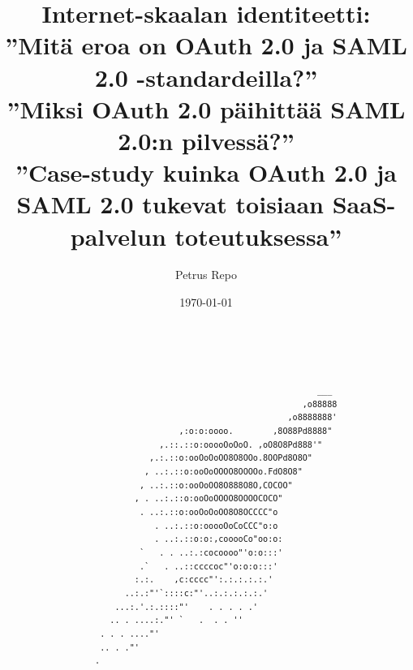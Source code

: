 \documentclass[finnish,gradu]{tktltiki}
\begin{document}
\title{Internet-skaalan identiteetti:
    \\ ''Mitä eroa on OAuth 2.0 ja SAML 2.0 -standardeilla?''
    \\ ''Miksi OAuth 2.0 päihittää SAML 2.0:n pilvessä?''
    \\ ''Case-study kuinka OAuth 2.0 ja SAML 2.0 tukevat toisiaan SaaS-palvelun toteutuksessa''}

\author{Petrus Repo}
\date{\today}
\maketitle


\onehalfspacing

\subject{Tietojenkäsittelytiede}


\begin{abstract}

  \begin{verbatim}




                                                            ___
                                                         ,o88888
                                                      ,o8888888'
                                ,:o:o:oooo.        ,8O88Pd8888"
                            ,.::.::o:ooooOoOoO. ,oO8O8Pd888'"
                          ,.:.::o:ooOoOoOO8O8OOo.8OOPd8O8O"
                         , ..:.::o:ooOoOOOO8OOOOo.FdO8O8"
                        , ..:.::o:ooOoOO8O888O8O,COCOO"
                       , . ..:.::o:ooOoOOOO8OOOOCOCO"
                        . ..:.::o:ooOoOoOO8O8OCCCC"o
                           . ..:.::o:ooooOoCoCCC"o:o
                           . ..:.::o:o:,cooooCo"oo:o:
                        `   . . ..:.:cocoooo"'o:o:::'
                        .`   . ..::ccccoc"'o:o:o:::'
                       :.:.    ,c:cccc"':.:.:.:.:.'
                     ..:.:"'`::::c:"'..:.:.:.:.:.'
                   ...:.'.:.::::"'    . . . . .'
                  .. . ....:."' `   .  . . ''
                . . . ...."'
                .. . ."'
               .

  \end{verbatim}

\end{abstract}
\end{document}
